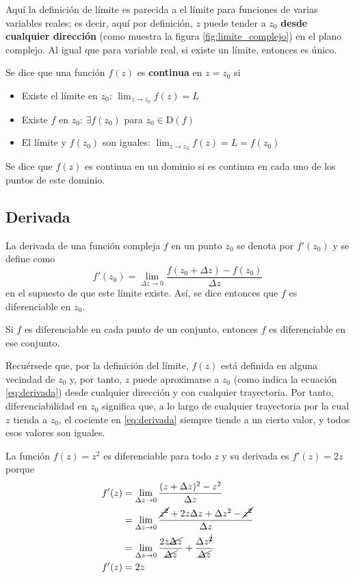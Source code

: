 Aquí la definición de límite es parecida a el límite para funciones de varias variables reales; es decir, aquí por definición, $z$ puede tender a $z_0$ \textbf{desde cualquier dirección} (como muestra la figura \ref{fig:limite_complejo}) en el plano complejo. Al igual que para variable real, si existe un límite, entonces es único.


Se dice que una función $f(z)$ es \textbf{continua} en $z=z_0$ si
\begin{itemize}
  \item Existe el límite en $z_0$: $\lim_{z\to z_0} f(z) = L$
  \item Existe $f$ en $z_0$: $\exists f(z_0) $ para $z_0 \in\text{D}(f)$
  \item El límite y $f(z_0)$ son iguales: $\lim_{z\to z_0} f(z) = L = f(z_0)$
\end{itemize}

Se dice que $f(z)$ es continua en un dominio si es continua en cada uno de los puntos de este dominio.

\subsection{Derivada}

La derivada de una función compleja $f$ en un punto $z_0$ se denota por $f'(z_0)$ y se define como
\begin{equation}
  \boxed{f'(z_0)=\lim_{\Delta z \to 0}\frac{f(z_0+\Delta z)-f(z_0)}{\Delta z}}
  \label{eq:derivada}
\end{equation}
en el supuesto de que este límite existe. Así, se dice entonces que $f$ es diferenciable en $z_0$. 

Si $f$ es diferenciable en cada punto de un conjunto, entonces $f$ es diferenciable en ese conjunto.

Recuérsede que, por la definición del límite, $f(z)$ está definida en alguna vecindad de $z_0$ y, por tanto, $z$ puede aproximarse a $z_0$ (como indica la ecuación \ref{eq:derivada}) desde cualquier dirección y con cualquier trayectoria. Por tanto, diferenciabilidad en $z_0$ significa que, a lo largo de cualquier trayectoria por la cual $z$ tienda a $z_0$, el cociente en \ref{eq:derivada} siempre tiende a un cierto valor, y todos esos valores son iguales. 
\begin{example}
  La función $f(z)=z^2$ es diferenciable para todo $z$ y su derivada es $f'(z)=2z$ porque
  \begin{align*}
    f'(z)&=\lim_{\Delta z \to 0} \frac{(z+\Delta z)^2-z^2}{\Delta z} \\
         &=\lim_{\Delta z \to 0} \frac{\cancel{z^2}+2z\Delta z + \Delta z^2 - \cancel{z^2}}{\Delta z} \\ 
         &=\lim_{\Delta z \to 0} \frac{2z\cancel{\Delta z}}{\cancel{\Delta z}} + \frac{\Delta z^{\cancel{2}}}{\cancel{\Delta z}} \\ 
    f'(z)&=2z
  \end{align*}
\end{example}


